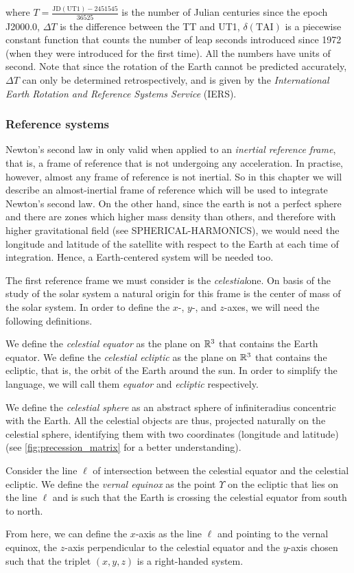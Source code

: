 \documentclass[../main.tex]{subfiles}
\begin{document}
where $ T=\frac{\text{JD}(\text{UT1})-2451545}{36525}$ is the number of Julian centuries since the epoch J2000.0, $\Delta T$ is the difference between the TT and UT1, $\delta(\text{TAI})$ is a piecewise constant function that counts the number of leap seconds introduced since 1972 (when they were introduced for the first time). All the numbers have units of second. Note that since the rotation of the Earth cannot be predicted accurately, $\Delta T$ can only be determined retrospectively, and is given by the \emph{International Earth Rotation and Reference Systems Service} (IERS).
\subsubsection{Reference systems}
Newton's second law in only valid when applied to an \emph{inertial reference frame}, that is, a frame of reference that is not undergoing any acceleration. In practise, however, almost any frame of reference is not inertial. So in this chapter we will describe an almost-inertial frame of reference which will be used to integrate Newton's second law. On the other hand, since the earth is not a perfect sphere and there are zones which higher mass density than others, and therefore with higher gravitational field (see SPHERICAL-HARMONICS), we would need the longitude and latitude of the satellite with respect to the Earth at each time of integration. Hence, a Earth-centered system will be needed too.

The first reference frame we must consider is the \emph{celestial}one. On basis of the study of the solar system a natural origin for this frame is the center of mass of the solar system. In order to define the $x$-, $y$-, and $z$-axes, we will need the following definitions.
\begin{definition}
  We define the \emph{celestial equator} as the plane on $\mathbb{R}^3$ that contains the Earth equator. We define the \emph{celestial ecliptic} as the plane on $\mathbb{R}^3$ that contains the ecliptic, that is, the orbit of the Earth around the sun. In order to simplify the language, we will call them \emph{equator} and \emph{ecliptic} respectively.
\end{definition}
\begin{definition}
  We define the \emph{celestial sphere} as an abstract sphere of infiniteradius concentric with the Earth. All the celestial objects are thus, projected naturally on the celestial sphere, identifying them with two coordinates (longitude and latitude) (see \cref{fig:precession_matrix} for a better understanding).
\end{definition}
\begin{definition}
  Consider the line $\ell$ of intersection between the celestial equator and the celestial ecliptic. We define the \emph{vernal equinox} as the point $\Upsilon$ on the ecliptic that lies on the line $\ell$ and is such that the Earth is crossing the celestial equator from south to north.
\end{definition}
From here, we can define the $x$-axis as the line $\ell$ and pointing to the vernal equinox, the $z$-axis perpendicular to the celestial equator and the $y$-axis chosen such that the triplet $(x,y,z)$ is a right-handed system.
\end{document}
